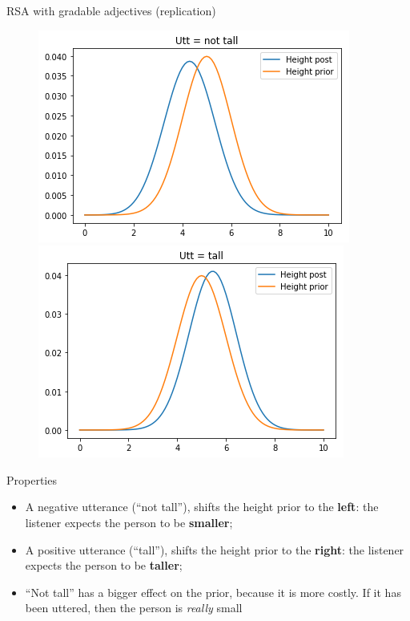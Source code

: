 \documentclass[xcolor=table, hyperref={pdfpagelabels=false}]{beamer}
\begin{document}
\begin{frame}{RSA with gradable adjectives (replication)}\vspace{-3mm}
\begin{figure}
		\includegraphics[width=.45\textwidth]{./images/unilateral_not_tall_height.png}
		\includegraphics[width=.45\textwidth]{./images/unilateral_tall_height.png}
\end{figure}\vspace{-6mm}
\begin{block}{Properties}
	\begin{itemize}
		\item A negative utterance (``not tall''), shifts the height prior to the \textbf{left}: the listener expects the person to be \textbf{smaller};
		\item A positive utterance (``tall''), shifts the height prior to the \textbf{right}: the listener expects the person to be \textbf{taller};
		\item ``Not tall'' has a bigger effect on the prior, because it is more costly. If it has been uttered, then the person is \textit{really} small
	\end{itemize}
\end{block}
\end{frame}
\end{document}
